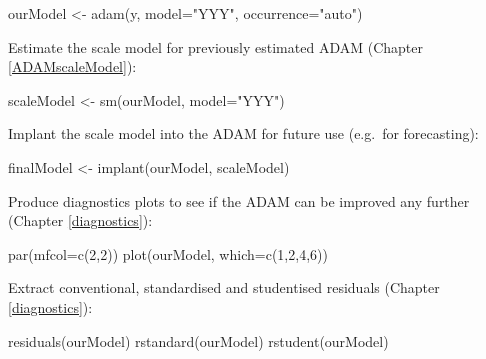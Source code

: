 \documentclass[
]{book}
\newenvironment{Shaded}{\begin{snugshade}}{\end{snugshade}}
\newcommand{\AttributeTok}[1]{\textcolor[rgb]{0.77,0.63,0.00}{#1}}
\newcommand{\DecValTok}[1]{\textcolor[rgb]{0.00,0.00,0.81}{#1}}
\newcommand{\FunctionTok}[1]{\textcolor[rgb]{0.00,0.00,0.00}{#1}}
\newcommand{\NormalTok}[1]{#1}
\newcommand{\OtherTok}[1]{\textcolor[rgb]{0.56,0.35,0.01}{#1}}
\newcommand{\StringTok}[1]{\textcolor[rgb]{0.31,0.60,0.02}{#1}}
\theoremstyle{definition}
\theoremstyle{definition}
\theoremstyle{definition}
\theoremstyle{definition}
\theoremstyle{remark}
\begin{document}
\begin{Shaded}
\begin{Highlighting}[]
\NormalTok{ourModel }\OtherTok{\textless{}{-}} \FunctionTok{adam}\NormalTok{(y, }\AttributeTok{model=}\StringTok{"YYY"}\NormalTok{, }\AttributeTok{occurrence=}\StringTok{"auto"}\NormalTok{)}
\end{Highlighting}
\end{Shaded}

Estimate the scale model for previously estimated ADAM (Chapter \ref{ADAMscaleModel}):

\begin{Shaded}
\begin{Highlighting}[]
\NormalTok{scaleModel }\OtherTok{\textless{}{-}} \FunctionTok{sm}\NormalTok{(ourModel, }\AttributeTok{model=}\StringTok{"YYY"}\NormalTok{)}
\end{Highlighting}
\end{Shaded}

Implant the scale model into the ADAM for future use (e.g.~for forecasting):

\begin{Shaded}
\begin{Highlighting}[]
\NormalTok{finalModel }\OtherTok{\textless{}{-}} \FunctionTok{implant}\NormalTok{(ourModel, scaleModel)}
\end{Highlighting}
\end{Shaded}

Produce diagnostics plots to see if the ADAM can be improved any further (Chapter \ref{diagnostics}):

\begin{Shaded}
\begin{Highlighting}[]
\FunctionTok{par}\NormalTok{(}\AttributeTok{mfcol=}\FunctionTok{c}\NormalTok{(}\DecValTok{2}\NormalTok{,}\DecValTok{2}\NormalTok{))}
\FunctionTok{plot}\NormalTok{(ourModel, }\AttributeTok{which=}\FunctionTok{c}\NormalTok{(}\DecValTok{1}\NormalTok{,}\DecValTok{2}\NormalTok{,}\DecValTok{4}\NormalTok{,}\DecValTok{6}\NormalTok{))}
\end{Highlighting}
\end{Shaded}

Extract conventional, standardised and studentised residuals (Chapter \ref{diagnostics}):

\begin{Shaded}
\begin{Highlighting}[]
\FunctionTok{residuals}\NormalTok{(ourModel)}
\FunctionTok{rstandard}\NormalTok{(ourModel)}
\FunctionTok{rstudent}\NormalTok{(ourModel)}
\end{Highlighting}
\end{Shaded}
\end{document}
